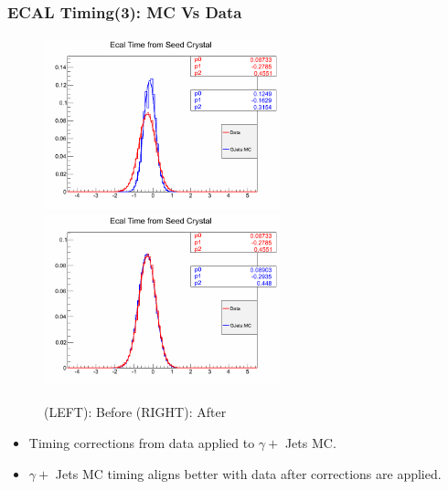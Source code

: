 \documentclass{beamer}
\begin{document}
\begin{frame}
\frametitle{\huge{ECAL Timing(3): MC Vs Data}}
  \begin{minipage}[b]{0.7\paperwidth}
    \begin{figure}[htbp]
    \mbox{\includegraphics[height=5.0cm,width=0.61\textwidth]            {THESISPLOTS/SeedTime_data-mc.png}
          \includegraphics[height=5.0cm,width=0.61\textwidth]            {THESISPLOTS/SeedTime_data-mc_Calib.png}}
    \caption{\alert{(LEFT)}: Before \alert{(RIGHT)}: After}
   \end{figure} 
 \end{minipage}
 
 \begin{minipage}[b]{0.8\paperwidth}
  \begin{itemize}
     \item Timing corrections from data applied to $\gamma +$ Jets MC.
     \item $\gamma +$ Jets MC timing aligns better with data after corrections are applied.
  \end{itemize}
\end{minipage}
\end{frame}
\end{document}
